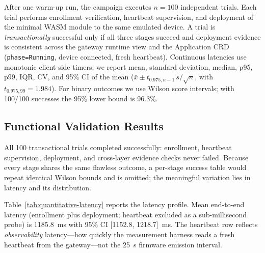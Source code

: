 After one warm-up run, the campaign executes $n{=}100$ independent trials. Each trial performs enrollment verification, heartbeat supervision, and deployment of the minimal WASM module to the same emulated device. A trial is \emph{transactionally} successful only if all three stages succeed and deployment evidence is consistent across the gateway runtime view and the Application CRD (\texttt{phase=Running}, device connected, fresh heartbeat). Continuous latencies use monotonic client-side timers; we report mean, standard deviation, median, p95, p99, IQR, CV, and 95\% CI of the mean ($\bar{x} \pm t_{0.975,n-1}\,s/\sqrt{n}$, with $t_{0.975,99}{=}1.984$). For binary outcomes we use Wilson score intervals; with 100/100 successes the 95\% lower bound is 96.3\%.

\subsection{Functional Validation Results}
All 100 transactional trials completed successfully: enrollment, heartbeat supervision, deployment, and cross-layer evidence checks never failed. Because every stage shares the same flawless outcome, a per-stage success table would repeat identical Wilson bounds and is omitted; the meaningful variation lies in latency and its distribution.

Table~\ref{tab:quantitative-latency} reports the latency profile. Mean end-to-end latency (enrollment plus deployment; heartbeat excluded as a sub-millisecond probe) is 1185.8~ms with 95\% CI [1152.8, 1218.7]~ms. The heartbeat row reflects \emph{observability} latency---how quickly the measurement harness reads a fresh heartbeat from the gateway---not the 25~s firmware emission interval.

\begin{table}[t]
\centering
\caption{Latency profile ($n{=}100$ trials). All values in milliseconds.}
\label{tab:quantitative-latency}
\footnotesize
\setlength{\tabcolsep}{2pt}
\end{table}

